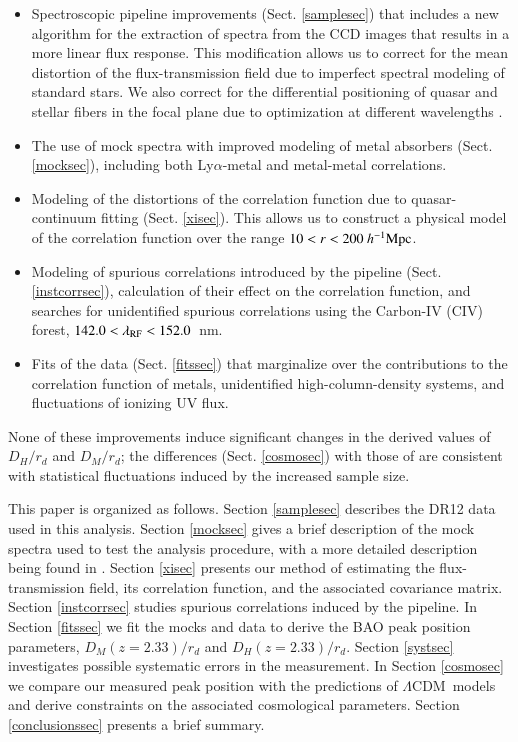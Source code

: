 \documentclass{aa}
\newcommand{\lamrf}{\lambda_{\rm RF}}
\newcommand{\hMpc}{h^{-1}{\rm Mpc}}
\newcommand{\lya}{Ly$\alpha$}
\newcommand{\DM}{D_M}
\newcommand{\DHub}{D_H}
\newcommand{\lcdm}{$\Lambda$CDM~}
\begin{document}
\begin{itemize}
\item Spectroscopic pipeline improvements (Sect. \ref{samplesec})
that includes  a new algorithm for the extraction of spectra from 
the CCD images that results in a more linear flux response.
This modification allows us to correct for 
the mean distortion of the flux-transmission 
field due to imperfect spectral modeling
of standard stars.
We also 
correct for the differential positioning of  quasar and stellar fibers in the
focal plane due to optimization at different wavelengths
\citep{2016ApJ...831..157M}.

\item The use of mock spectra with improved modeling of metal absorbers 
(Sect. \ref{mocksec}),
including both \lya-metal and metal-metal correlations.

\item Modeling of the distortions of the correlation function
due to quasar-continuum fitting
(Sect. \ref{xisec}).  This allows us to construct a physical
model of the correlation function over the range $10<r<200~\hMpc$.

\item Modeling of spurious correlations introduced by the pipeline 
(Sect. \ref{instcorrsec}), calculation of their effect
on the correlation function, and searches for unidentified
spurious correlations  using the Carbon-IV (CIV) forest,
$142.0<\lamrf<152.0$~nm.

\item Fits of the data (Sect. \ref{fitssec}) that
marginalize over the contributions to the correlation function
of metals, unidentified high-column-density systems, 
and fluctuations of ionizing UV flux.

\end{itemize}
None of these improvements induce significant
changes in the derived values of $\DHub/r_d$ and $\DM/r_d$; the differences
(Sect. \ref{cosmosec}) with those of
\citet{2015A&A...574A..59D} are consistent with statistical
fluctuations induced by the increased sample size. 



This paper is organized as follows.
Section \ref{samplesec} describes the DR12 data used in this
analysis. Section \ref{mocksec} gives a brief description of the
mock spectra used to test the analysis procedure, with
a more detailed description being found in \citet{2015JCAP...05..060B}.
Section \ref{xisec} presents our method of estimating 
the flux-transmission field, 
its
correlation function,
and the associated
covariance matrix.
Section \ref{instcorrsec} studies spurious correlations induced by the pipeline.
In Section \ref{fitssec} we fit the mocks and data to derive the BAO
peak position parameters, $\DM(z=2.33)/r_d$ and $\DHub(z=2.33)/r_d$.
Section \ref{systsec} investigates possible systematic errors
in the measurement.
In Section \ref{cosmosec} we compare our measured peak position
with the predictions of \lcdm models and derive constraints
on the associated cosmological parameters.
Section \ref{conclusionssec} presents a brief summary.
\end{document}
